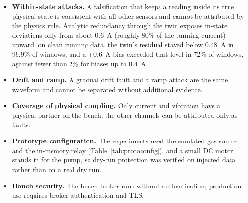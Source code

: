 \begin{itemize}
  \item \textbf{Within-state attacks.} A falsification that keeps a reading inside its true physical state is consistent with all other sensors and cannot be attributed by the physics rule. Analytic redundancy through the twin exposes in-state deviations only from about 0.6~A (roughly 80\% of the running current) upward: on clean running data, the twin's residual stayed below 0.48~A in 99.9\% of windows, and a +0.6~A bias exceeded that level in 72\% of windows, against fewer than 2\% for biases up to 0.4~A.
  \item \textbf{Drift and ramp.} A gradual drift fault and a ramp attack are the same waveform and cannot be separated without additional evidence.
  \item \textbf{Coverage of physical coupling.} Only current and vibration have a physical partner on the bench; the other channels can be attributed only as faults.
  \item \textbf{Prototype configuration.} The experiments used the emulated gas source and the in-memory relay (Table~\ref{tab:protoconfig}), and a small DC motor stands in for the pump, so dry-run protection was verified on injected data rather than on a real dry run.
  \item \textbf{Bench security.} The bench broker runs without authentication; production use requires broker authentication and TLS.
\end{itemize}
